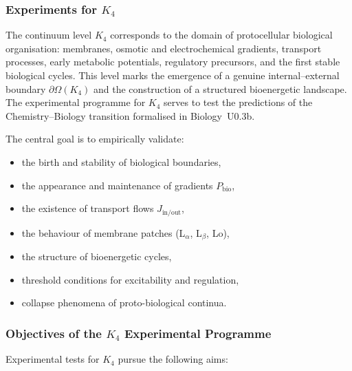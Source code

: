 
\subsubsection{Experiments for \texorpdfstring{$K_4$}{K_4}}
\label{sec:experiments-k4}

The continuum level $K_4$ corresponds to the domain of protocellular
biological organisation: membranes, osmotic and electrochemical 
gradients, transport processes, early metabolic potentials, 
regulatory precursors, and the first stable biological cycles.  
This level marks the emergence of a genuine internal–external 
boundary $\partial\Omega(K_4)$ and the construction of a structured 
bioenergetic landscape.  
The experimental programme for $K_4$ serves to test the 
predictions of the Chemistry--Biology transition formalised in 
Biology~U0.3b.

The central goal is to empirically validate:

\begin{itemize}
    \item the birth and stability of biological boundaries,
    \item the appearance and maintenance of gradients $P_{\mathrm{bio}}$,
    \item the existence of transport flows $J_{\mathrm{in/out}}$,
    \item the behaviour of membrane patches (L$_\alpha$, L$_\beta$, Lo),
    \item the structure of bioenergetic cycles,
    \item threshold conditions for excitability and regulation,
    \item collapse phenomena of proto-biological continua.
\end{itemize}



\subsubsection{Objectives of the \texorpdfstring{$K_4$}{K_4} Experimental Programme}

Experimental tests for $K_4$ pursue the following aims:

